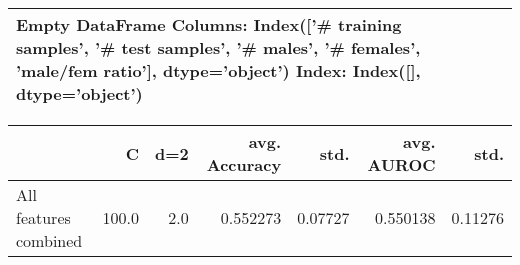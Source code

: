 \begin{tabular}{llllll}
\hline
Empty DataFrame
Columns: Index(['\# training samples', '\# test samples', '\# males', '\# females',
       'male/fem ratio'],
      dtype='object')
Index: Index([], dtype='object') \\
\hline
\end{tabular}
\begin{tabular}{lrrrrrr}
\hline
{} &      C &  d=2 &  avg. Accuracy &     std. &  avg. AUROC &     std. \\
\hline
All features combined &  100.0 &  2.0 &       0.552273 &  0.07727 &    0.550138 &  0.11276 \\
\hline
\end{tabular}
